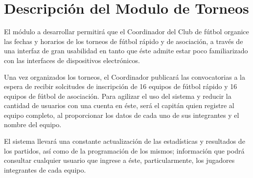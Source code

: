 \section{Descripción del Modulo de Torneos}

\begin{description}

\item El módulo a desarrollar permitirá que el Coordinador del Club de fútbol organice las fechas y horarios de los torneos de fútbol rápido y de asociación, a través de una interfaz de gran usabilidad en tanto que éste admite estar poco familiarizado con las interfaces de dispositivos electrónicos.

Una vez organizados los torneos, el Coordinador publicará las convocatorias a la espera de recibir solcitudes de inscripción de 16 equipos de fútbol rápido y 16 equipos de fútbol de asociación. Para agilizar el uso del sistema y reducir la cantidad de usuarios con una cuenta en éste, será el capitán quien registre al equipo completo, al proporcionar los datos de cada uno de sus integrantes y el nombre del equipo.

El sistema llevará una constante actualización de las estadísticas y resultados de los partidos, así como de la programación de los mismos; información que podrá consultar cualquier usuario que ingrese a éste, particularmente, los jugadores integrantes de cada equipo.

\end{description}

